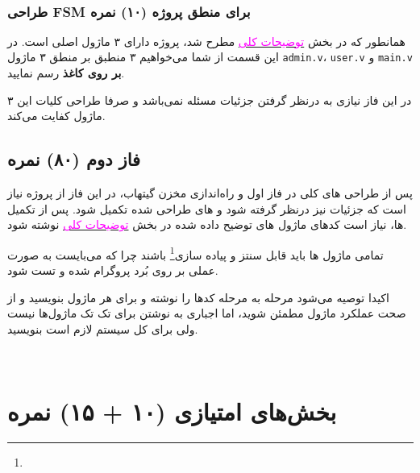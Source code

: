 \documentclass[]{article}
\begin{document}
\newpage
\Large \textbf{\\
}



\subsubsection*{{\titr طراحی FSM برای منطق پروژه} (۱۰) نمره}
\label{subsubsec:fsm}

همانطور که در بخش 
\hyperref[sec:detail]{\textcolor{magenta}{توضیحات کلی}}
مطرح شد، پروژه دارای ۳ ماژول اصلی است. در این قسمت از شما می‌خواهیم ۳  منطبق بر منطق ۳ ماژول \texttt{admin.v}، \texttt{user.v} و \texttt{main.v} \textbf{بر روی کاغذ} رسم نمایید.

در این فاز نیازی به درنظر گرفتن جزئیات مسئله نمی‌باشد و صرفا طراحی کلیات این ۳ ماژول کفایت می‌کند.





\subsection*{{\titr فاز دوم} (۸۰) نمره}
پس از طراحی  های کلی در فاز اول و راه‌اندازی مخزن گیتهاب، در این فاز از پروژه نیاز است که جزئیات نیز درنظر گرفته شود و  های طراحی شده تکمیل شود. پس از تکمیل  ها، نیاز است کدهای  ماژول های توضیح داده شده در بخش 
\hyperref[sec:detail]{\textcolor{magenta}{توضیحات کلی}}
نوشته شود. 

تمامی ماژول ها باید قابل سنتز و پیاده سازی\footnote{} باشند چرا که می‌بایست به صورت عملی بر روی بُرد پروگرام شده و تست شود.

اکیدا توصیه می‌شود مرحله به مرحله کد‌ها را نوشته و برای هر ماژول  بنویسید و از صحت عملکرد ماژول مطمئن شوید، اما اجباری به نوشتن  برای تک تک ماژول‌ها نیست ولی برای کل سیستم لازم است  بنویسید.



\newpage
\Large \textbf{\\
}



\section*{{\titr بخش‌های امتیازی} (۱۰ + ۱۵) نمره}
\end{document}

